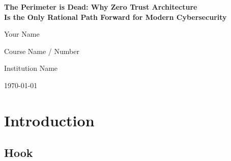 \documentclass[12pt, letterpaper]{article}
\begin{document}
\begin{titlepage}
    \centering
    \vspace*{2cm}
    {\LARGE\bfseries The Perimeter is Dead: Why Zero Trust Architecture\\
    Is the Only Rational Path Forward for Modern Cybersecurity\par}
    \vspace{2cm}
    {\large Your Name\par}
    \vspace{0.5cm}
    {\large Course Name / Number\par}
    {\large Institution Name\par}
    \vspace{0.5cm}
    {\large \today\par}
    \vfill
\end{titlepage}

\begin{abstract}
%
\end{abstract}

\newpage
\tableofcontents
\newpage

\section{Introduction}

\subsection{Hook}
\end{document}
